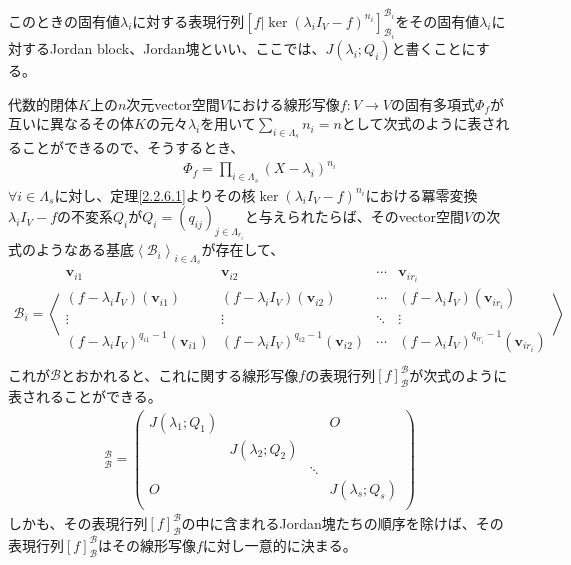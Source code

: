 \documentclass[dvipdfmx]{jsarticle}
\begin{document}
\begin{dfn*}
このときの固有値$\lambda_{i}$に対する表現行列$\left[ f|\ker\left( \lambda_{i}I_{V} - f \right)^{n_{i}} \right]_{\mathcal{B}_{i}}^{\mathcal{B}_{i}}$をその固有値$\lambda_{i}$に対するJordan block、Jordan塊といい、ここでは、$J\left( \lambda_{i};Q_{i} \right)$と書くことにする。
\end{dfn*}
\begin{thm*}
代数的閉体$K$上の$n$次元vector空間$V$における線形写像$f:V \rightarrow V$の固有多項式$\varPhi_{f}$が互いに異なるその体$K$の元々$\lambda_{i}$を用いて$\sum_{i \in \varLambda_{s}} n_{i} = n$として次式のように表されることができるので、そうするとき、
\begin{align*}
\varPhi_{f} = \prod_{i \in \varLambda_{s}} \left( X - \lambda_{i} \right)^{n_{i}}
\end{align*}
$\forall i \in \varLambda_{s}$に対し、定理\ref{2.2.6.1}よりその核$\ker\left( \lambda_{i}I_{V} - f \right)^{n_{i}}$における冪零変換$\lambda_{i}I_{V} - f$の不変系$Q_{i}$が$Q_{i} = \left( q_{ij} \right)_{j \in \varLambda_{r_{i}}}$と与えられたらば、そのvector空間$V$の次式のようなある基底$\left\langle \mathcal{B}_{i} \right\rangle_{i \in \varLambda_{s}}$が存在して、
\begin{align*}
\mathcal{B}_{i} = \left\langle \begin{matrix}
\mathbf{v}_{i1} & \mathbf{v}_{i2} & \cdots & \mathbf{v}_{ir_{i}} \\
\left( f - \lambda_{i}I_{V} \right)\left( \mathbf{v}_{i1} \right) & \left( f - \lambda_{i}I_{V} \right)\left( \mathbf{v}_{i2} \right) & \cdots & \left( f - \lambda_{i}I_{V} \right)\left( \mathbf{v}_{ir_{i}} \right) \\
 \vdots & \vdots & \ddots & \vdots \\
\left( f - \lambda_{i}I_{V} \right)^{q_{i1} - 1}\left( \mathbf{v}_{i1} \right) & \left( f - \lambda_{i}I_{V} \right)^{q_{i2} - 1}\left( \mathbf{v}_{i2} \right) & \cdots & \left( f - \lambda_{i}I_{V} \right)^{q_{ir_{i}} - 1}\left( \mathbf{v}_{ir_{i}} \right) \\
\end{matrix} \right\rangle
\end{align*}
これが$\mathcal{B}$とおかれると、これに関する線形写像$f$の表現行列$[ f]_{\mathcal{B}}^{\mathcal{B}}$が次式のように表されることができる。
\begin{align*}
[ f]_{\mathcal{B}}^{\mathcal{B}} = \begin{pmatrix}
J\left( \lambda_{1};Q_{1} \right) & \  & \  & O \\
\  & J\left( \lambda_{2};Q_{2} \right) & \  & \  \\
\  & \  & \ddots & \  \\
O & \  & \  & J\left( \lambda_{s};Q_{s} \right) \\
\end{pmatrix}
\end{align*}
しかも、その表現行列$[ f]_{\mathcal{B}}^{\mathcal{B}}$の中に含まれるJordan塊たちの順序を除けば、その表現行列$[ f]_{\mathcal{B}}^{\mathcal{B}}$はその線形写像$f$に対し一意的に決まる。
\end{thm*}
\end{document}

